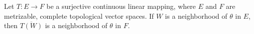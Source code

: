Let $T: E \to F$ be a surjective continuous linear mapping, where $E$ and $F$ are metrizable, complete topological vector spaces. If $W$ is a neighborhood of $\theta$ in $E$, then $\overline{T(W)}$ is a neighborhood of $\theta$ in $F$.
